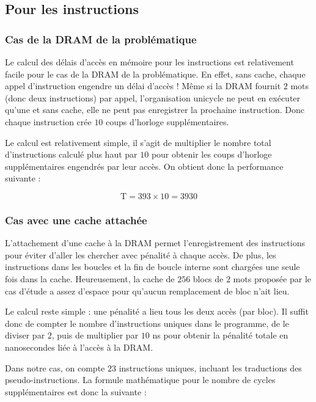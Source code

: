 \documentclass[a11paper]{article}
\begin{document}
\subsection{Pour les instructions}
\subsubsection{Cas de la DRAM de la problématique}

Le calcul des délais d'accès en mémoire pour les instructions est
relativement facile pour le cas de la DRAM de la problématique. En effet,
sans cache, chaque appel d'instruction engendre un délai d'accès ! Même si
la DRAM fournit $2$ mots (donc deux instructions) par appel, l'organisation
unicycle ne peut en exécuter qu'une et sans cache, elle ne peut pas
enregistrer la prochaine instruction. Donc chaque instruction crée $10$
coups d'horloge supplémentaires.

Le calcul est relativement simple, il s'agit de multiplier le nombre total
d'instructions calculé plus haut par $10$ pour obtenir les coups d'horloge
supplémentaires engendrés par leur accès. On obtient donc la performance
suivante :

\begin{equation}
  \text{T}=393\times10=3930
\end{equation}

\subsubsection{Cas avec une cache attachée}

L'attachement d'une cache à la DRAM permet l'enregistrement des instructions
pour éviter d'aller les chercher avec pénalité à chaque accès. De plus, les
instructions dans les boucles et la fin de boucle interne sont chargées une
seule fois dans la cache. Heureusement, la cache de $256$ blocs de $2$ mots
proposée par le cas d'étude a assez d'espace pour qu'aucun remplacement de
bloc n'ait lieu.

Le calcul reste simple : une pénalité a lieu tous les deux accès (par bloc).
Il suffit donc de compter le nombre d'instructions uniques dans le programme,
de le diviser par $2$, puis de multiplier par $10$ ns pour obtenir la pénalité
totale en nanosecondes liée à l'accès à la DRAM.

Dans notre cas, on compte $23$ instructions uniques, incluant les traductions
des pseudo-instructions. La formule mathématique pour le nombre de cycles
supplémentaires est donc la suivante :
\end{document}
